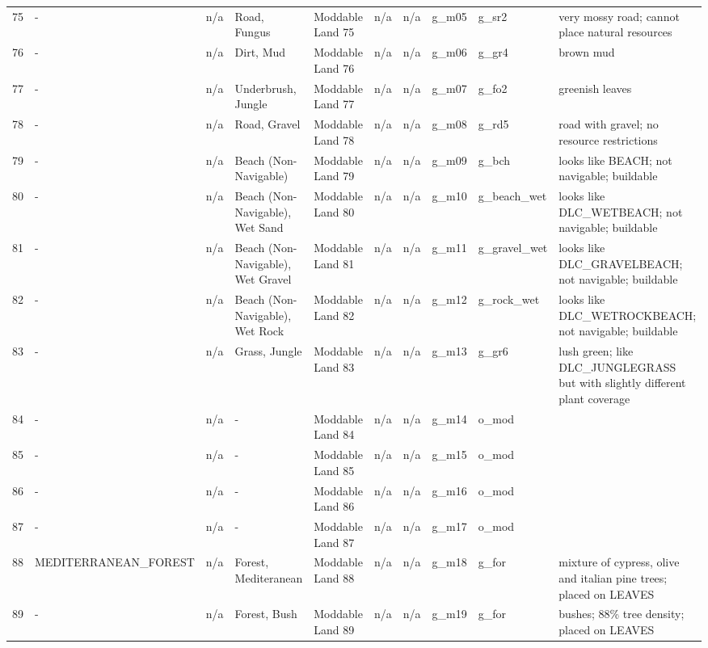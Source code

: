 \begin{appendices}
\begin{landscape}
\begin{longtable}{@{}p{5mm}|p{25mm}p{23mm}|p{14mm}p{14mm}p{14mm}p{14mm}|p{10mm}p{15mm}|p{45mm}@{}}
            75	& -	& n/a	& Road, Fungus	& Moddable Land 75	& n/a	& n/a	& g\_m05	& g\_sr2		& very mossy road; cannot place natural resources \\
            76	& -	& n/a	& Dirt, Mud	& Moddable Land 76	& n/a	& n/a	& g\_m06	& g\_gr4		& brown mud \\
            77	& -	& n/a	& Underbrush, Jungle	& Moddable Land 77	& n/a	& n/a	& g\_m07	& g\_fo2		& greenish leaves \\
            78	& -	& n/a	& Road, Gravel	& Moddable Land 78	& n/a	& n/a	& g\_m08	& g\_rd5		& road with gravel; no resource restrictions \\
            79	& -	& n/a	& Beach (Non-Navigable)	& Moddable Land 79	& n/a	& n/a	& g\_m09	& g\_bch		& looks like BEACH; not navigable; buildable \\
            80	& -	& n/a	& Beach (Non-Navigable), Wet Sand	& Moddable Land 80	& n/a	& n/a	& g\_m10	& g\_beach\_wet		& looks like DLC\_WETBEACH; not navigable; buildable \\
            81	& -	& n/a	& Beach (Non-Navigable), Wet Gravel	& Moddable Land 81	& n/a	& n/a	& g\_m11	& g\_gravel\_wet		& looks like DLC\_GRAVELBEACH; not navigable; buildable \\
            82	& -	& n/a	& Beach (Non-Navigable), Wet Rock	& Moddable Land 82	& n/a	& n/a	& g\_m12	& g\_rock\_wet		& looks like DLC\_WETROCKBEACH; not navigable; buildable \\
            83	& -	& n/a	& Grass, Jungle	& Moddable Land 83	& n/a	& n/a	& g\_m13	& g\_gr6		& lush green; like DLC\_JUNGLEGRASS but with slightly different plant coverage \\
            84	& -	& n/a	& -	& Moddable Land 84	& n/a	& n/a	& g\_m14	& o\_mod		&  \\
            85	& -	& n/a	& -	& Moddable Land 85	& n/a	& n/a	& g\_m15	& o\_mod		&  \\
            86	& -	& n/a	& -	& Moddable Land 86	& n/a	& n/a	& g\_m16	& o\_mod		&  \\
            87	& -	& n/a	& -	& Moddable Land 87	& n/a	& n/a	& g\_m17	& o\_mod		&  \\
            88	& MEDITERRANEAN\_FOREST	& n/a	& Forest, Mediteranean	& Moddable Land 88	& n/a	& n/a	& g\_m18	& g\_for		& mixture of cypress, olive and italian pine trees; placed on LEAVES \\
            89	& -	& n/a	& Forest, Bush	& Moddable Land 89	& n/a	& n/a	& g\_m19	& g\_for		& bushes; 88\% tree density; placed on LEAVES \\

\end{longtable}
\end{landscape}
\end{appendices}
